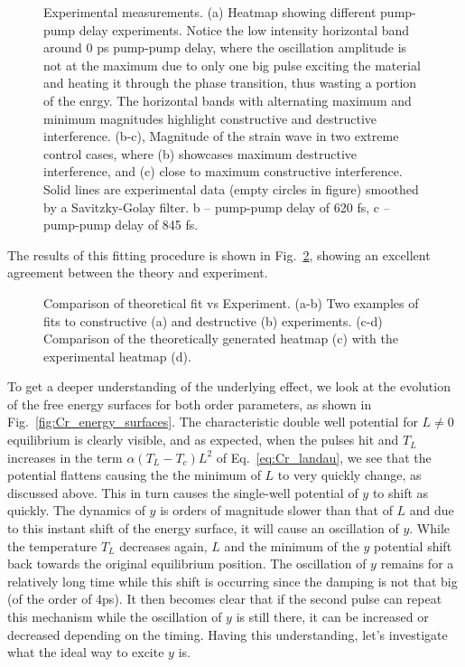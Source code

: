 \begin{figure}
\caption{\label{fig:Cr_experimental}Experimental measurements. (a) Heatmap showing different pump-pump delay experiments. Notice the low intensity horizontal band around 0 ps pump-pump delay, where the oscillation amplitude is not at the maximum due to only one big pulse exciting the material and heating it through the phase transition, thus wasting a portion of the enrgy. The horizontal bands with alternating maximum and minimum magnitudes highlight constructive and destructive interference. (b-c), Magnitude of the strain wave in two extreme control cases, where (b) showcases maximum destructive interference, and (c) close to maximum constructive interference. Solid lines are experimental data (empty circles in figure) smoothed by a Savitzky-Golay filter.  b – pump-pump delay of 620 fs, c – pump-pump delay of 845 fs.}
\end{figure}

The results of this fitting procedure is shown in Fig.~\ref{fig:Cr_theoretical_fit}, showing an excellent agreement between the theory and experiment.
\begin{figure}
\caption{\label{fig:Cr_theoretical_fit} Comparison of theoretical fit vs Experiment. (a-b) Two examples of fits to constructive (a) and destructive (b) experiments. (c-d) Comparison of the theoretically generated heatmap (c) with the experimental heatmap (d).}
\end{figure}

To get a deeper understanding of the underlying effect, we look at the evolution of the free energy surfaces for both order parameters, as shown in Fig.~\ref{fig:Cr_energy_surfaces}. The characteristic double well potential for $L\neq0$ equilibrium is clearly visible, and as expected, when the pulses hit and $T_L$ increases in the term $\alpha(T_L-T_c)L^2$ of Eq.~\ref{eq:Cr_landau}, we see that the potential flattens causing the the minimum of $L$ to very quickly change, as discussed above. This in turn causes the single-well potential of $y$ to shift as quickly. The dynamics of $y$ is orders of magnitude slower than that of $L$ and due to this instant shift of the energy surface, it will cause an oscillation of $y$. While the temperature $T_L$ decreases again, $L$ and the minimum of the $y$ potential shift back towards the original equilibrium position. The oscillation of $y$ remains for a relatively long time while this shift is occurring since the damping is not that big (of the order of 4ps). It then becomes clear that if the second pulse can repeat this mechanism while the oscillation of $y$ is still there, it can be increased or decreased depending on the timing. Having this understanding, let's investigate what the ideal way to excite $y$ is. 


